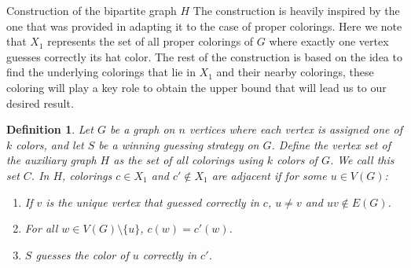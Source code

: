 \documentclass[11pt, letterpaper]{article}
\theoremstyle{plain}
\theoremstyle{plain}
\newtheorem{definition}[theorem]{Definition}
\begin{document}
\begin{section}{Construction of the bipartite graph $H$}
The construction is heavily inspired by the one that was provided in \cite{shurman2026upper} adapting it to the case of proper colorings. Here we note that $X_{1}$ represents the set of all proper colorings of $G$ where exactly one vertex guesses correctly its hat color. The rest of the construction is based on the idea to find the underlying colorings that lie in $X_{1}$ and their nearby colorings, these coloring will play a key role to obtain the upper bound that will lead us to our desired result.
\begin{definition}
Let $G$ be a graph on $n$ vertices where each vertex is assigned one of $k$ colors, and let $S$ be a winning guessing strategy on $G$. Define the vertex set of the auxiliary graph $H$ as the set of all colorings using $k$ colors of $G$. We call this set $C$. In $H$, colorings $c \in X_1$ and $c' \notin X_1$ are adjacent if for some $u \in V(G)$:
\begin{enumerate}[(P\arabic*)]
    \item If $v$ is the unique vertex that guessed correctly in $c$, $u \neq v$ and $uv \notin E(G)$. 
    \item For all $w \in V(G) \setminus \{u\}$, $c(w)=c'(w)$.
    \item $S$ guesses the color of $u$ correctly in $c'$. 
\end{enumerate}
\end{definition}


\end{section}
\end{document}
